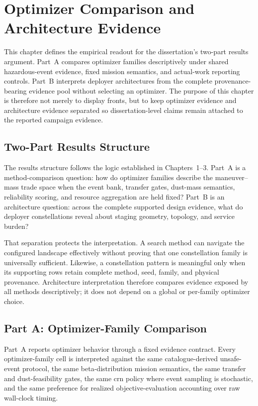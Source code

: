 \chapter{Optimizer Comparison and Architecture Evidence} \label{ch:results}

This chapter defines the empirical readout for the dissertation's two-part results argument. Part~A compares optimizer families descriptively under shared hazardous-event evidence, fixed mission semantics, and actual-work reporting controls. Part~B interprets deployer architectures from the complete provenance-bearing evidence pool without selecting an optimizer. The purpose of this chapter is therefore not merely to display fronts, but to keep optimizer evidence and architecture evidence separated so dissertation-level claims remain attached to the reported campaign evidence.

\section{Two-Part Results Structure} \label{se:results_structure}

The results structure follows the logic established in Chapters~1--3. Part~A is a method-comparison question: how do optimizer families describe the maneuver--mass trade space when the event bank, transfer gates, dust-mass semantics, reliability scoring, and resource aggregation are held fixed? Part~B is an architecture question: across the complete supported design evidence, what do deployer constellations reveal about staging geometry, topology, and service burden?

That separation protects the interpretation. A search method can navigate the configured landscape effectively without proving that one constellation family is universally sufficient. Likewise, a constellation pattern is meaningful only when its supporting rows retain complete method, seed, family, and physical provenance. Architecture interpretation therefore compares evidence exposed by all methods descriptively; it does not depend on a global or per-family optimizer choice.

\section{Part A: Optimizer-Family Comparison} \label{se:part_a_results}

Part~A reports optimizer behavior through a fixed evidence contract. Every optimizer-family cell is interpreted against the same catalogue-derived unsafe-event protocol, the same beta-distribution mission semantics, the same transfer and dust-feasibility gates, the same \gls{crn} policy where event sampling is stochastic, and the same preference for realized objective-evaluation accounting over raw wall-clock timing.

